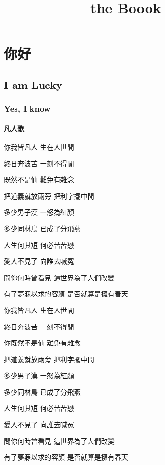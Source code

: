 \documentclass[lang=cn]{boook}
\title{the Boook}
\begin{document}
\maketitle

\chapter{你好}
\section{I am Lucky}
\subsection{Yes, I know}
\subsubsection{凡人歌}
你我皆凡人 生在人世間

終日奔波苦 一刻不得閒

既然不是仙 難免有雜念

把道義就放兩旁 把利字擺中間

多少男子漢 一怒為紅顏

多少同林鳥 已成了分飛燕

人生何其短 何必苦苦戀

愛人不見了 向誰去喊冤

問你何時曾看見 這世界為了人們改變

有了夢寐以求的容顏 是否就算是擁有春天

你我皆凡人 生在人世間

終日奔波苦 一刻不得閒

你既然不是仙 難免有雜念

把道義就放兩旁 把利字擺中間

多少男子漢 一怒為紅顏

多少同林鳥 已成了分飛燕

人生何其短 何必苦苦戀

愛人不見了 向誰去喊冤

問你何時曾看見 這世界為了人們改變

有了夢寐以求的容顏 是否就算是擁有春天
\end{document}

